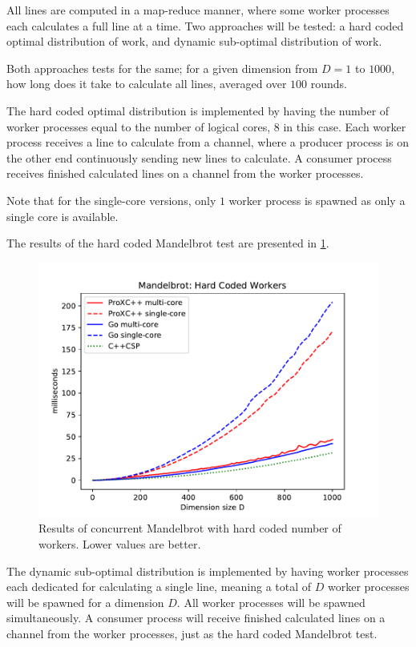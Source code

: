 All lines are computed in a map\hyp{}reduce manner, where some worker processes each calculates a full line at a time. Two approaches will be tested: a hard coded optimal distribution of work, and dynamic sub\hyp{}optimal distribution of work.

Both approaches tests for the same; for a given dimension from $D=1$ to $1000$, how long does it take to calculate all lines, averaged over $100$ rounds. 

The hard coded optimal distribution is implemented by having the number of worker processes equal to the number of logical cores, $8$ in this case. Each worker process receives a line to calculate from a channel, where a producer process is on the other end continuously sending new lines to calculate. A consumer process receives finished calculated lines on a channel from the worker processes.

Note that for the single\hyp{}core versions, only $1$ worker process is spawned as only a single core is available.

The results of the hard coded Mandelbrot test are presented in \cref{fig:mandelbrot_hardcoded}.

\begin{figure}[h!]
    \centering
    \includegraphics[width=0.9\linewidth]{fig/mandelbrot_hardcoded}
    \caption{Results of concurrent Mandelbrot with hard coded number of workers. Lower values are better.}
    \label{fig:mandelbrot_hardcoded}
\end{figure}

The dynamic sub-optimal distribution is implemented by having worker processes each dedicated for calculating a single line, meaning a total of $D$ worker processes will be spawned for a dimension $D$. All worker processes will be spawned simultaneously. A consumer process will receive finished calculated lines on a channel from the worker processes, just as the hard coded Mandelbrot test.


